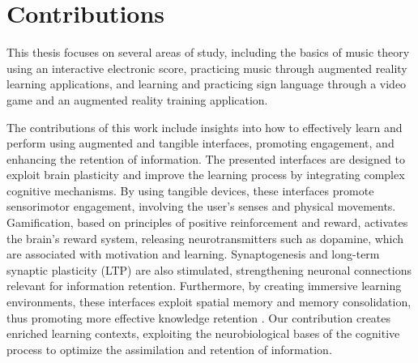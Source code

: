 \section{Contributions}

This thesis focuses on several areas of study, including the basics of music theory using an interactive electronic score, practicing music through augmented reality learning applications, and learning and practicing sign language through a video game and an augmented reality training application.  

The contributions of this work include insights into how to effectively learn and perform using augmented and tangible interfaces, promoting engagement, and enhancing the retention of information. The presented interfaces are designed to exploit brain plasticity and improve the learning process by integrating complex cognitive mechanisms. By using tangible devices, these interfaces promote sensorimotor engagement, involving the user's senses and physical movements. Gamification, based on principles of positive reinforcement and reward, activates the brain's reward system, releasing neurotransmitters such as dopamine, which are associated with motivation and learning. Synaptogenesis and long-term synaptic plasticity (LTP) are also stimulated, strengthening neuronal connections relevant for information retention. Furthermore, by creating immersive learning environments, these interfaces exploit spatial memory and memory consolidation, thus promoting more effective knowledge retention \cite{janssen2017gamification}. Our contribution creates enriched learning contexts, exploiting the neurobiological bases of the cognitive process to optimize the assimilation and retention of information. 